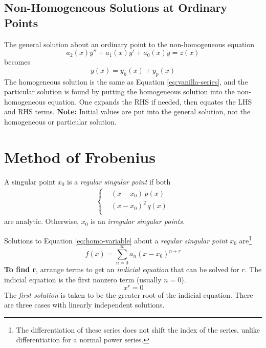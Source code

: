 \subsection{Non-Homogeneous Solutions at Ordinary Points}
The general solution about an ordinary point to the non-homogeneous equation 
\begin{equation}
    a_2(x) y'' + a_1(x) y'+ a_0(x) y = z(x)
\end{equation}
becomes
\begin{equation}
    y(x) = y_h(x) + y_p(x)
\end{equation}
The homogeneous solution is the same as Equation \ref{eq:vanilla-series}, and the particular solution is found by putting the homogeneous solution into the non-homogeneous equation. One expands the RHS if needed, then equates the LHS and RHS terms. \textbf{Note:} Initial values are put into the general solution, not the homogeneous or particular solution.


\section{Method of Frobenius}
A singular point $x_0$ is a \emph{regular singular point} if both
\begin{align*}
\begin{cases}
& (x-x_0) \,p(x) \\
& (x-x_0)^2 \,q(x) \\
\end{cases}
\end{align*}
are analytic. Otherwise, $x_0$ is an \emph{irregular singular points.}

Solutions to Equation \ref{eq:homo-variable} about a \emph{regular singular point} $x_0$ are\footnote{The differentiation of these series does not shift the index of the series, unlike differentiation for a normal power series.}
\begin{equation} \label{eq:frobenius-series}
    f(x) = \sum_{n=0}^\infty a_n (x-x_0)^{n+r}
\end{equation}
\textbf{To find r}, arrange terms to get an \emph{indicial equation} that can be solved for $r$. The indicial equation is the first nonzero term (usually $n=0$).
\begin{equation*}
    [\cdots]\, x^r = 0
\end{equation*}
The \emph{first solution} is taken to be the greater root of the indicial equation. There are three cases with linearly independent solutions.

